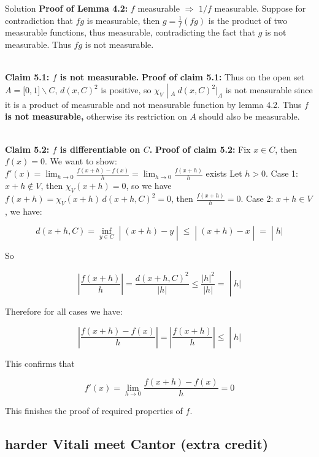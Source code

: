 \documentclass{qlnotes-export}
\begin{document}
\begin{qlsolution}{Solution}
\textbf{Proof of Lemma 4.2:} \(f\) measurable \(\Longrightarrow\) \(1/f\) measurable. Suppose for contradiction that \(fg\) is measurable, then \(g = \frac{1}{f}(fg)\) is the product of two measurable functions, thus measurable, contradicting the fact that \(g\) is not measurable. Thus \(fg\) is not measurable.\\
\strut \\
\textbf{Claim 5.1: \(f\) is not measurable.} \textbf{Proof of claim 5.1:} Thus on the open set \(A = \lbrack 0,1\rbrack\backslash C\), \(d(x,C)^{2}\) is positive, so \(\left. \chi_{V} \middle| {}_{A}\ d(x,C)^{2}|_{A} \right.\) is not measurable since it is a product of measurable and not measurable function by lemma 4.2. Thus \textbf{\(f\) is not measurable,} otherwise its restriction on \(A\) should also be measurable.\\
\strut \\
\textbf{Claim 5.2: \(f\) is differentiable on \(C\).} \textbf{Proof of claim 5.2:} Fix \(x \in C\), then \(f(x) = 0\). We want to show:\(f'(x) = \lim_{h\rightarrow 0}\frac{f(x + h) - f(x)}{h} = \lim_{h\rightarrow 0}\frac{f(x + h)}{h}\) exists Let \(h > 0\). Case 1: \(x + h \notin V\), then \(\chi_{V}(x + h) = 0\), so we have \(f(x + h) = \chi_{V}(x + h)\, d(x + h,C)^{2} = 0\), then \(\frac{f(x + h)}{h} = 0\). Case 2: \(x + h \in V\), we have:

\[\left. d(x + h,C) = \inf\limits_{y \in C} \middle| (x + h) - y \middle| \leq \middle| (x + h) - x \middle| = \middle| h| \right.\]

So

\[\left. \left| \frac{f(x + h)}{h} \right| = \frac{d(x + h,C)^{2}}{|h|} \leq \frac{|h|^{2}}{|h|} = \middle| h| \right.\]

Therefore for all cases we have:

\[\left. \left| \frac{f(x + h) - f(x)}{h} \right| = \left| \frac{f(x + h)}{h} \right| \leq \middle| h| \right.\]

This confirms that

\[f'(x) = \lim\limits_{h\rightarrow 0}\frac{f(x + h) - f(x)}{h} = 0\]

This finishes the proof of required properties of \(f\).

\end{qlsolution}

\subsection{harder Vitali meet Cantor (extra credit)}\label{harder-vitali-meet-cantor-extra-credit}
\end{document}

